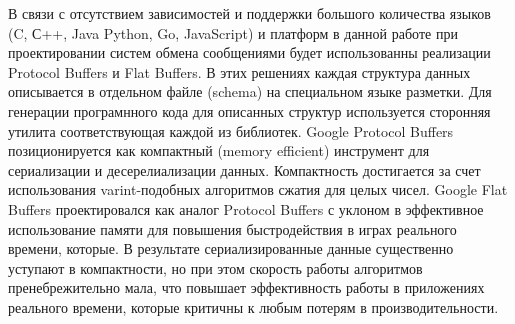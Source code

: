 В связи с отсутствием зависимостей и поддержки большого количества языков (C, С++, Java Python, Go, JavaScript) и платформ  в данной работе при проектировании систем обмена сообщениями будет использованны реализации Protocol Buffers и Flat Buffers. В этих решениях каждая структура данных описывается в отдельном файле (schema) на специальном языке разметки. Для генерации програмнного кода для описанных структур используется сторонняя утилита соответствующая каждой из библиотек. Google Protocol Buffers позиционируется как компактный (memory efficient) инструмент для сериализации и десерелиализации данных. Компактность достигается за счет использования varint-подобных алгоритмов сжатия для целых чисел. Google Flat Buffers проектировался как аналог Protocol Buffers с уклоном в эффективное использование памяти для повышения быстродействия в играх реального времени, которые. В результате сериализированные данные существенно уступают в компактности, но при этом скорость работы алгоритмов пренебрежительно мала, что повышает эффективность работы в приложениях реального времени, которые критичны к любым потерям в производительности.
